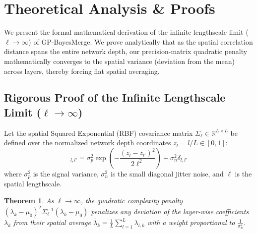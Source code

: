 \documentclass{article}
\theoremstyle{plain}
\newtheorem{theorem}{Theorem}[section]
\theoremstyle{definition}
\theoremstyle{remark}
\begin{document}










\newpage
\appendix
\onecolumn

\section{Theoretical Analysis \& Proofs}
\label{sec:appendix_proofs}

We present the formal mathematical derivation of the infinite lengthscale limit ($\ell \to \infty$) of GP-BayesMerge. We prove analytically that as the spatial correlation distance spans the entire network depth, our precision-matrix quadratic penalty mathematically converges to the spatial variance (deviation from the mean) across layers, thereby forcing flat spatial averaging.

\subsection{Rigorous Proof of the Infinite Lengthscale Limit ($\ell \to \infty$)}

Let the spatial Squared Exponential (RBF) covariance matrix $\Sigma_{\ell} \in \mathbb{R}^{L \times L}$ be defined over the normalized network depth coordinates $z_l = l/L \in [0, 1]$:
\begin{equation}
[\Sigma_{\ell}]_{l, l'} = \sigma_p^2 \exp\left( - \frac{(z_l - z_{l'})^2}{2\ell^2} \right) + \sigma_n^2 \delta_{l, l'}
\end{equation}
where $\sigma_p^2$ is the signal variance, $\sigma_n^2$ is the small diagonal jitter noise, and $\ell$ is the spatial lengthscale. 

\begin{theorem}
As $\ell \to \infty$, the quadratic complexity penalty $(\lambda_k - \mu_0)^T \Sigma_{\ell}^{-1} (\lambda_k - \mu_0)$ penalizes any deviation of the layer-wise coefficients $\lambda_k$ from their spatial average $\bar{\lambda}_k = \frac{1}{L} \sum_{l=1}^L \lambda_{l, k}$ with a weight proportional to $\frac{1}{\sigma_n^2}$.
\end{theorem}
\end{document}

